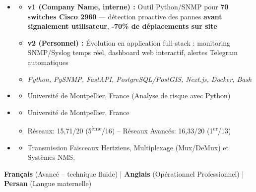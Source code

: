 \documentclass[11pt,a4paper]{article}
\renewcommand{\itemspace}{\vspace{0.15em}}
\begin{document}
\begin{itemize}[leftmargin=1em, label={}]
    \item
    \begin{itemize}[leftmargin=1.5em, label=$\circ$, nosep]
        \item \textbf{v1 (Company Name, interne) :} Outil Python/SNMP pour \textbf{70 switches Cisco 2960} — détection proactive des pannes \textbf{avant signalement utilisateur}, \textbf{-70\% de déplacements sur site}
        \item \textbf{v2 (Personnel) :} Évolution en application full-stack : monitoring SNMP/Syslog temps réel, dashboard web interactif, alertes Telegram automatiques
        \item \emph{Python, PySNMP, FastAPI, PostgreSQL/PostGIS, Next.js, Docker, Bash}
    \end{itemize}
\end{itemize}

\begin{itemize}[leftmargin=1em, label={}]
    \item
    \begin{itemize}[leftmargin=1.5em, label=$\circ$, nosep]
        \item Université de Montpellier, France (Analyse de risque avec Python)
    \end{itemize}
    \itemspace
    \item
    \begin{itemize}[leftmargin=1.5em, label=$\circ$, nosep]
        \item Université de Montpellier, France
        \item Réseaux: 15,71/20 (5\textsuperscript{ème}/16) -- Réseaux Avancés: 16,33/20 (1\textsuperscript{er}/13)
    \end{itemize}
    \itemspace
    \item
    \begin{itemize}[leftmargin=1.5em, label=$\circ$, nosep]
        \item Transmission Faisceaux Hertziens, Multiplexage (Mux/DeMux) et Systèmes NMS.
    \end{itemize}
\end{itemize}

\noindent
\textbf{Français} (Avancé -- technique fluide) | \textbf{Anglais} (Opérationnel Professionnel) | \textbf{Persan} (Langue maternelle)
\end{document}
